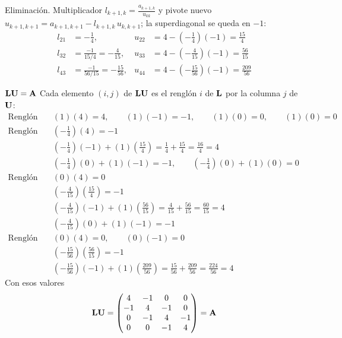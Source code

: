 
Eliminación. Multiplicador $l_{k+1,k} = \frac{a_{k+1,k}}{u_{kk}}$ y pivote nuevo $u_{k+1,k+1} = a_{k+1,k+1} - l_{k+1,k}\,u_{k,k+1}$; la superdiagonal se queda en $-1$:
\begin{align*}
	l_{21} &= -\frac{1}{4}, & u_{22} &= 4 - \left(-\frac{1}{4}\right)(-1) = \frac{15}{4}\\
	l_{32} &= \frac{-1}{15/4} = -\frac{4}{15}, & u_{33} &= 4 - \left(-\frac{4}{15}\right)(-1) = \frac{56}{15}\\
	l_{43} &= \frac{-1}{56/15} = -\frac{15}{56}, & u_{44} &= 4 - \left(-\frac{15}{56}\right)(-1) = \frac{209}{56}
\end{align*}

$\mathbf{L}\mathbf{U} = \mathbf{A}$
Cada elemento $(i,j)$ de $\mathbf{L}\mathbf{U}$ es el renglón $i$ de $\mathbf{L}$ por la columna $j$ de $\mathbf{U}$:
\begin{align*}
	\text{Renglón 1:}&\quad (1)(4) = 4, \qquad (1)(-1) = -1, \qquad (1)(0) = 0, \qquad (1)(0) = 0\\
	\text{Renglón 2:}&\quad \left(-\tfrac14\right)(4) = -1\\
	&\quad \left(-\tfrac14\right)(-1) + (1)\left(\tfrac{15}{4}\right) = \tfrac14 + \tfrac{15}{4} = \tfrac{16}{4} = 4\\
	&\quad \left(-\tfrac14\right)(0) + (1)(-1) = -1, \qquad \left(-\tfrac14\right)(0) + (1)(0) = 0\\
	\text{Renglón 3:}&\quad (0)(4) = 0\\
	&\quad \left(-\tfrac{4}{15}\right)\left(\tfrac{15}{4}\right) = -1\\
	&\quad \left(-\tfrac{4}{15}\right)(-1) + (1)\left(\tfrac{56}{15}\right) = \tfrac{4}{15} + \tfrac{56}{15} = \tfrac{60}{15} = 4\\
	&\quad \left(-\tfrac{4}{15}\right)(0) + (1)(-1) = -1\\
	\text{Renglón 4:}&\quad (0)(4) = 0, \qquad (0)(-1) = 0\\
	&\quad \left(-\tfrac{15}{56}\right)\left(\tfrac{56}{15}\right) = -1\\
	&\quad \left(-\tfrac{15}{56}\right)(-1) + (1)\left(\tfrac{209}{56}\right) = \tfrac{15}{56} + \tfrac{209}{56} = \tfrac{224}{56} = 4
\end{align*}
Con esos valores
\[
\mathbf{L}\mathbf{U} =
\begin{pmatrix} 4 & -1 & 0 & 0\\ -1 & 4 & -1 & 0\\ 0 & -1 & 4 & -1\\ 0 & 0 & -1 & 4 \end{pmatrix} = \mathbf{A}
\]
